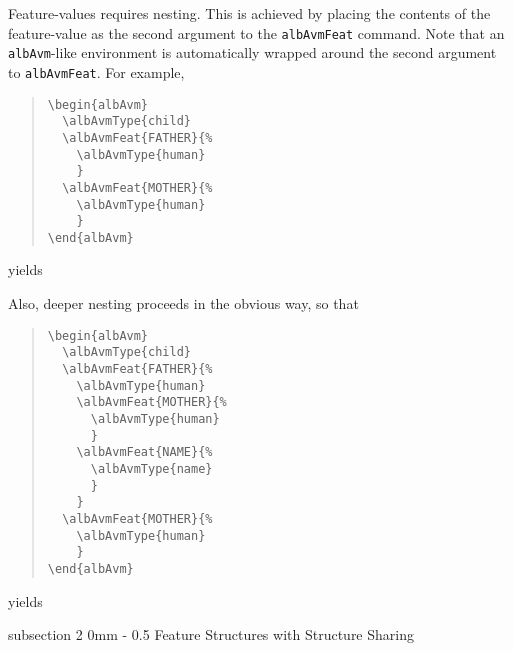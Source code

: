 \documentclass[11pt,a4paper,oneside]{article}
\makeatletter
\renewcommand{\subsection}{\@startsection%
  {subsection}%
  {2}%
  {0mm}%
  {-\baselineskip}%
  {0.5\baselineskip}%
  {\normalfont\sffamily\bfseries\large}%
  }
\makeatother
\begin{document}
Feature-values requires nesting.  This is achieved by placing the
contents of the feature-value as the second argument to the
\texttt{albAvmFeat} command.  Note that an \texttt{albAvm}-like
environment is automatically wrapped around the second argument to
\texttt{albAvmFeat}.  For example,
\begin{quote}
\begin{verbatim}
\begin{albAvm}
  \albAvmType{child}
  \albAvmFeat{FATHER}{%
    \albAvmType{human}
    }
  \albAvmFeat{MOTHER}{%
    \albAvmType{human}
    }
\end{albAvm}
\end{verbatim}
\end{quote}
yields
\begin{quote}  
  \begin{albAvm}
  \end{albAvm}
\end{quote}
Also, deeper nesting proceeds in the obvious way, so that 
\begin{quote}
\begin{verbatim}
\begin{albAvm}
  \albAvmType{child}
  \albAvmFeat{FATHER}{%
    \albAvmType{human}
    \albAvmFeat{MOTHER}{%
      \albAvmType{human}
      }
    \albAvmFeat{NAME}{%
      \albAvmType{name}
      }
    }
  \albAvmFeat{MOTHER}{%
    \albAvmType{human}
    }
\end{albAvm}
\end{verbatim}
\end{quote}
yields
\begin{quote}
  \begin{albAvm}
  \end{albAvm}
\end{quote}


\subsection{Feature Structures with Structure Sharing}
\label{sec:avm-examples:feat-struct-with-struct-s}
\end{document}
